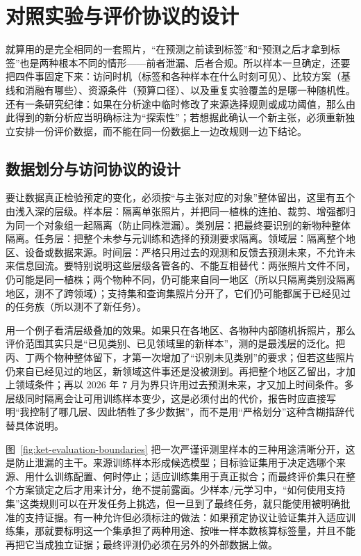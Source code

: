 \section{对照实验与评价协议的设计}
\label{sec:ket-evaluation-protocol}

就算用的是完全相同的一套照片，“在预测之前读到标签”和“预测之后才拿到标签”也是两种根本不同的情形——前者泄漏、后者合规。所以样本一旦确定，还要把四件事固定下来：访问时机（标签和各种样本在什么时刻可见）、比较方案（基线和消融有哪些）、资源条件（预算口径）、以及重复实验覆盖的是哪一种随机性。还有一条研究纪律：如果在分析途中临时修改了来源选择规则或成功阈值，那么由此得到的新分析应当明确标注为“探索性”；若想据此确认一个新主张，必须重新独立安排一份评价数据，而不能在同一份数据上一边改规则一边下结论。

\subsection{数据划分与访问协议的设计}
\label{sec:ket-evaluation-splits}

要让数据真正检验预定的变化，必须按“与主张对应的对象”整体留出，这里有五个由浅入深的层级。样本层：隔离单张照片，并把同一植株的连拍、裁剪、增强都归为同一个对象组一起隔离（防止同株泄漏）。类别层：把最终要识别的新物种整体隔离。任务层：把整个未参与元训练和选择的预测要求隔离。领域层：隔离整个地区、设备或数据来源。时间层：严格只用过去的观测和反馈去预测未来，不允许未来信息回流。要特别说明这些层级各管各的、不能互相替代：两张照片文件不同，仍可能是同一植株；两个物种不同，仍可能来自同一地区（所以只隔离类别没隔离地区，测不了跨领域）；支持集和查询集照片分开了，它们仍可能都属于已经见过的任务族（所以测不了新任务）。

用一个例子看清层级叠加的效果。如果只在各地区、各物种内部随机拆照片，那么评价范围其实只是“已见类别、已见领域里的新样本”，测的是最浅层的泛化。把丙、丁两个物种整体留下，才第一次增加了“识别未见类别”的要求；但若这些照片仍来自已经见过的地区，新领域这件事还是没被测到。再把整个地区乙留出，才加上领域条件；再以 2026 年 7 月为界只许用过去预测未来，才又加上时间条件。多层级同时隔离会让可用训练样本变少，这是必须付出的代价，报告时应直接写明“我控制了哪几层、因此牺牲了多少数据”，而不是用“严格划分”这种含糊措辞代替具体说明。

图~\ref{fig:ket-evaluation-boundaries} 把一次严谨评测里样本的三种用途清晰分开，这是防止泄漏的主干。来源训练样本形成候选模型；目标验证集用于决定选哪个来源、用什么训练配置、何时停止；适应训练集用于真正拟合；而最终评价集只在整个方案锁定之后才用来计分，绝不提前露面。少样本/元学习中，“如何使用支持集”这类规则可以在开发任务上挑选，但一旦到了最终任务，就只能使用被明确批准的支持证据。有一种允许但必须标注的做法：如果预定协议让验证集并入适应训练集，那就要标明这一个集承担了两种用途、按唯一样本数核算标签量，并且不能再把它当成独立证据；最终评测仍必须在另外的外部数据上做。

